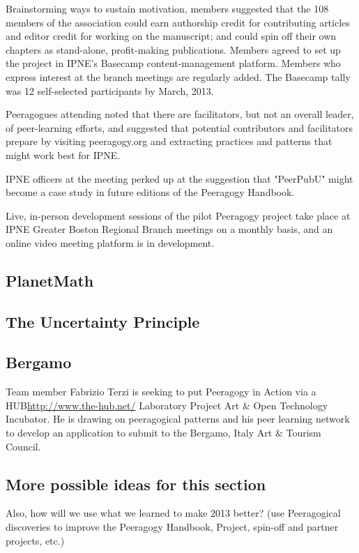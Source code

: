 \documentclass{acm_proc_article-sp}
\begin{document}
Brainstorming ways to sustain motivation, members suggested that the 108 members of the association could earn authorship credit for contributing articles and editor credit for working on the manuscript; and could spin off their own chapters as stand-alone, profit-making publications.
Members agreed to set up the project in IPNE’s Basecamp content-management platform. Members who express interest at the branch meetings are regularly added. The Basecamp tally was 12 self-selected participants by March, 2013. 

Peeragogues attending noted that there are facilitators, but not an overall leader, of peer-learning efforts, and suggested that potential contributors and facilitators prepare by visiting peeragogy.org and extracting practices and patterns that might work best for IPNE.

IPNE officers at the meeting perked up at the suggestion that "PeerPubU" might become a case study in future editions of the Peeragogy Handbook.

Live, in-person development sessions of the pilot Peeragogy project take place at IPNE Greater Boston Regional Branch meetings on a monthly basis, and an online video meeting platform is in development.

\subsection{PlanetMath}

\subsection{The Uncertainty Principle}

\subsection{Bergamo}

Team member Fabrizio Terzi is seeking to put Peeragogy in Action via a HUB\url{http://www.the-hub.net/} Laboratory Project Art \& Open Technology Incubator. He is drawing on peeragogical patterns and his peer learning network to develop an application to submit to the Bergamo, Italy Art \& Tourism Council.


\subsection{More possible ideas for this section}

Also, how will we use what we learned to make 2013 better? (use
Peeragogical discoveries to improve the Peeragogy Handbook, Project,
spin-off and partner projects, etc.)
\end{document}
